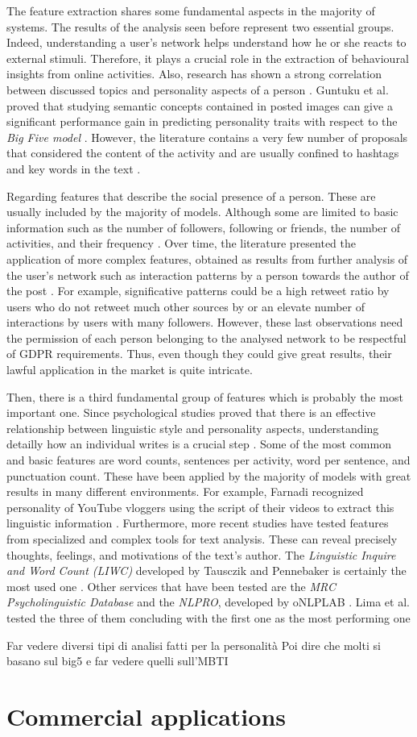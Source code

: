 The feature extraction shares some fundamental aspects in the majority of systems. The results of the analysis seen before represent two essential groups.
Indeed, understanding a user's network helps understand how he or she reacts to external stimuli. Therefore, it plays a crucial role in the extraction of behavioural insights from online activities.
Also, research has shown a strong correlation between discussed topics and personality aspects of a person \cite{kern2016gaining}.
Guntuku et al. proved that studying semantic concepts contained in posted images can give a significant performance gain in predicting personality traits with respect to the \emph{Big Five model} \cite{guntuku2017studying}.
However, the literature contains a very few number of proposals that considered the content of the activity and are usually confined to hashtags and key words in the text \cite{ruan2016finding}. 

Regarding features that describe the social presence of a person. These are usually included by the majority of models. Although some are limited to basic information such as the number of followers, following or friends, the number of activities, and their frequency \cite{quercia2011our}.
Over time, the literature presented the application of more complex features, obtained as results from further analysis of the user's network such as interaction patterns by a person towards the author of the post \cite{dickinson2015identifying}.
For example, significative patterns could be a high retweet ratio by users who do not retweet much other sources by or an elevate number of interactions by users with many followers. However, these last observations need the permission of each person belonging to the analysed network to be respectful of GDPR requirements. Thus, even though they could give great results, their lawful application in the market is quite intricate.

Then, there is a third fundamental group of features which is probably the most important one.
Since psychological studies proved that there is an effective relationship between linguistic style and personality aspects, understanding detailly how an individual writes is a crucial step \cite{pennebaker1999linguistic}.  
Some of the most common and basic features are word counts, sentences per activity, word per sentence, and punctuation count. These have been applied by the majority of models with great results in many different environments.
For example, Farnadi recognized personality of YouTube vloggers using the script of their videos to extract this linguistic information \cite{farnadi2014multivariate}.
Furthermore, more recent studies have tested features from specialized and complex tools for text analysis. These can reveal precisely thoughts, feelings, and motivations of the text's author.
The \emph{Linguistic Inquire and Word Count (LIWC)} developed by Tausczik and Pennebaker is certainly the most used one \cite{tausczik2010psychological}.
Other services that have been tested are the \emph{MRC Psycholinguistic Database} and the \emph{NLPRO}, developed by oNLPLAB \cite{wilson1988mrc, tsarfaty2018natural}. Lima et al. tested the three of them concluding with the first one as the most performing one \cite{lima2019tecla}

Far vedere diversi tipi di analisi fatti per la personalità
Poi dire che molti si basano sul big5 e far vedere quelli sull'MBTI
\section{Commercial applications}